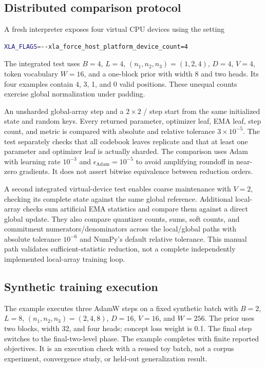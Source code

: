 \documentclass[11pt,a4paper]{article}
\begin{document}
\subsection{Distributed comparison protocol}
A fresh interpreter exposes four virtual CPU devices using the setting
\begin{lstlisting}[language=bash]
XLA_FLAGS=--xla_force_host_platform_device_count=4
\end{lstlisting}
The integrated test uses
\(B=4\), \(L=4\), \((n_1,n_2,n_3)=(1,2,4)\), \(D=4\), \(V=4\),
token vocabulary \(W=16\), and a one-block prior with width 8 and two heads.
Its four examples contain 4, 3, 1, and 0 valid positions. These unequal
counts exercise global normalization under padding.

An unsharded global-array step and a \(2\times2\)
/ step start from the same initialized state and random
keys. Every returned parameter, optimizer leaf, EMA leaf, step count, and
metric is compared with absolute and relative tolerance \(3\times10^{-5}\).
The test separately checks that all codebook leaves replicate and that at
least one parameter and optimizer leaf is actually sharded. The comparison
uses Adam with learning rate \(10^{-3}\) and \(\epsilon_{\mathrm{Adam}}=10^{-5}\)
to avoid amplifying roundoff in near-zero gradients. It does not assert
bitwise equivalence between reduction orders.

A second integrated virtual-device test enables coarse maintenance with
\(V=2\), checking its complete state against the same global reference.
Additional local-array  checks sum artificial EMA statistics and
compare them against a direct global update. They also compare quantizer
counts, sums, soft counts, and commitment numerators/denominators across the
local/global paths with absolute tolerance \(10^{-6}\) and NumPy's default
relative tolerance. This manual path validates sufficient-statistic reduction,
not a complete independently implemented local-array training loop.

\subsection{Synthetic training execution}
The example executes three AdamW steps on a fixed synthetic batch with
\(B=2\), \(L=8\), \((n_1,n_2,n_3)=(2,4,8)\), \(D=16\), \(V=16\),
and \(W=256\). The prior uses two blocks, width 32, and four heads; concept
loss weight is 0.1. The final step switches to the final-two-level phase.
The example completes with finite reported objectives. It is an execution
check with a reused toy batch, not a corpus experiment, convergence study,
or held-out generalization result.
\end{document}
